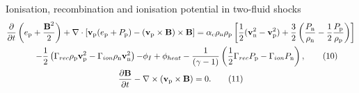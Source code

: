 \documentclass[10pt,aspectratio=169,usenames,dvipsnames]{beamer}
\begin{document}
\begin{frame}{Ionisation, recombination and ionisation potential in two-fluid shocks}
\begin{gather}
\frac{\partial}{\partial t} \left( e_{\text{p}} + \frac{\textbf{B}^2}{2} \right) + \nabla \cdot \left[ \textbf{v}_{\text{p}} ( e_{\text{p}} + P_{\text{p}}) -  (\textbf{v}_{\rm p} \times \textbf{B}) \times \textbf{B} \right]  =  \alpha _c \rho _{\text{n}} \rho _{\text{p}} \left[ \frac{1}{2} (\textbf{v}_{\text{n}} ^2 - \textbf{v}_{\text{p}} ^2)+ \frac{3}{2} \left(\frac{P_{\rm n}}{\rho_{\rm n}}-\frac{1}{2}\frac{P_{\rm p}}{\rho_{\rm p}}\right) \right] \nonumber \\ \hspace{0.5cm}- \frac{1}{2} \left( \Gamma _{rec} \rho _{\rm p} \textbf{v}_{\rm p} ^2 - \Gamma _{ion} \rho _{\rm n} \textbf{v}_{\rm n} ^2 \right) {- \phi_I + \phi_{heat}} -\frac{1}{ (\gamma-1)} \left( \frac{1}{2} \Gamma _{rec} P_{\rm p} -\Gamma _{ion} P_{\rm n} \right), \label{eqn:ep} \tag{10}\\
\frac{\partial \textbf{B}}{\partial t} - \nabla \times (\textbf{v}_{\text{p}} \times \textbf{B}) = 0.\tag{11}
\end{gather}
\end{frame}
\end{document}
